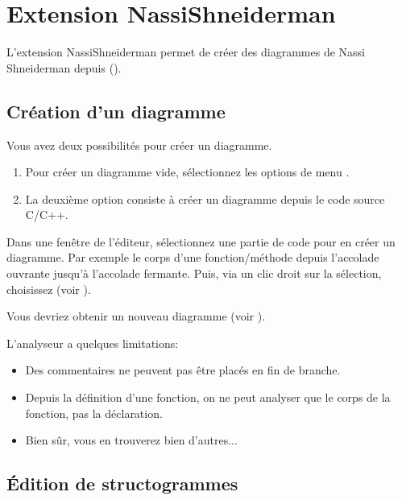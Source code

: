 \section{Extension NassiShneiderman}\label{sec:nassishneiderman}

L'extension NassiShneiderman permet de créer des diagrammes de Nassi Shneiderman depuis \codeblocks (\cite{url:nassi}). 

\subsection{Création d'un diagramme}

Vous avez deux possibilités pour créer un diagramme.

\begin{enumerate}
\item Pour créer un diagramme vide, sélectionnez les options de menu .
\item La deuxième option consiste à créer un diagramme depuis le code source C/C++. 
\end{enumerate}

Dans une fenêtre de l'éditeur, sélectionnez une partie de code pour en créer un diagramme. Par exemple le corps d'une fonction/méthode depuis l'accolade ouvrante jusqu'à l'accolade fermante. Puis, via un clic droit sur la sélection, choisissez  (voir ). 


Vous devriez obtenir un nouveau diagramme (voir ).


L'analyseur a quelques limitations:

\begin{itemize}
\item Des commentaires ne peuvent pas être placés en fin de branche.
\item Depuis la définition d'une fonction, on ne peut analyser que le corps de la fonction, pas la déclaration.
\item Bien sûr, vous en trouverez bien d'autres... 
\end{itemize}

\subsection{Édition de structogrammes}
